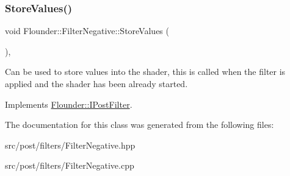 \subsubsection{\texorpdfstring{Store\+Values()}{StoreValues()}}
{\footnotesize\ttfamily void Flounder\+::\+Filter\+Negative\+::\+Store\+Values (\begin{DoxyParamCaption}{ }\end{DoxyParamCaption})\hspace{0.3cm}{\ttfamily [override]}, {\ttfamily [virtual]}}



Can be used to store values into the shader, this is called when the filter is applied and the shader has been already started. 



Implements \hyperlink{class_flounder_1_1_i_post_filter_a20420ec0a9bac67437740552bea9ab74}{Flounder\+::\+I\+Post\+Filter}.



The documentation for this class was generated from the following files\+:\begin{DoxyCompactItemize}
\item 
src/post/filters/Filter\+Negative.\+hpp\item 
src/post/filters/Filter\+Negative.\+cpp\end{DoxyCompactItemize}
